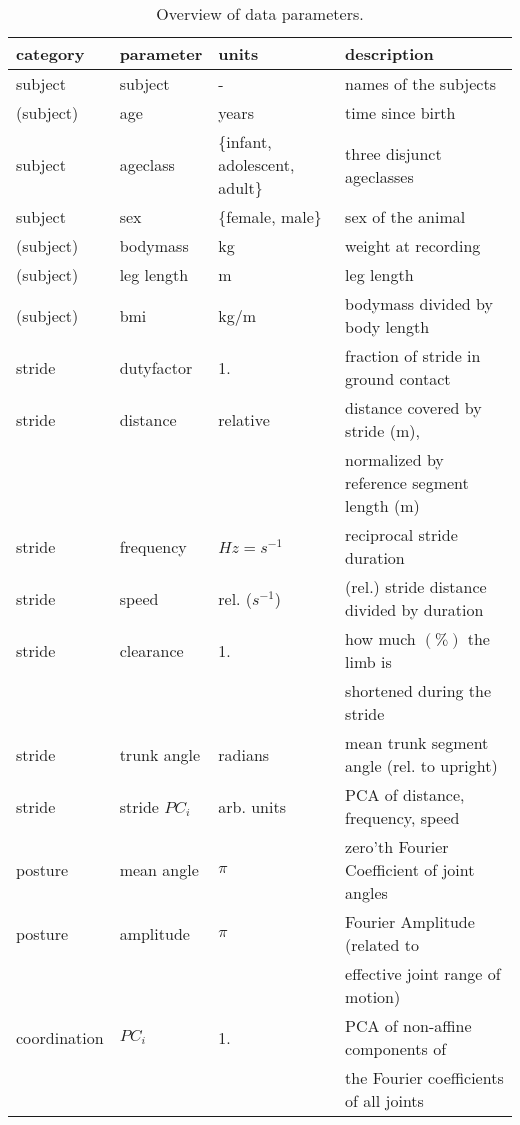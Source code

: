 \begin{table}[htbp]
\caption{\label{tab:parameters}Overview of data parameters.}
\centering
\begin{tabular}{llll}
\hline
\textbf{category} & \textbf{parameter} & \textbf{units} & \textbf{description}\\[0pt]
\hline
\hline
subject & subject & - & names of the subjects\\[0pt]
(subject) & age & years & time since birth\\[0pt]
subject & ageclass & \{infant, adolescent, adult\} & three disjunct ageclasses\\[0pt]
subject & sex & \{female, male\} & sex of the animal\\[0pt]
(subject) & bodymass & kg & weight at recording\\[0pt]
(subject) & leg length & m & leg length\\[0pt]
(subject) & bmi & kg/m & bodymass divided by body length\\[0pt]
\hline
stride & dutyfactor & 1. & fraction of stride in ground contact\\[0pt]
stride & distance & relative & distance covered by stride (m),\\[0pt]
 &  &  & normalized by reference segment length (m)\\[0pt]
stride & frequency & \(Hz = s^{-1}\) & reciprocal stride duration\\[0pt]
stride & speed & rel. (\(s^{-1}\)) & (rel.) stride distance divided by duration\\[0pt]
stride & clearance & 1. & how much \((\%)\) the limb is\\[0pt]
 &  &  & shortened during the stride\\[0pt]
stride & trunk angle & radians & mean trunk segment angle (rel. to upright)\\[0pt]
stride & stride \(PC_{i}\) & arb. units & PCA of distance, frequency, speed\\[0pt]
\hline
posture & mean angle & \(\pi\) & zero'th Fourier Coefficient of joint angles\\[0pt]
posture & amplitude & \(\pi\) & Fourier Amplitude (related to\\[0pt]
 &  &  & effective joint range of motion)\\[0pt]
\hline
coordination & \(PC_{i}\) & 1. & PCA of non-affine components of\\[0pt]
 &  &  & the Fourier coefficients of all joints\\[0pt]
\hline
\end{tabular}
\end{table}


